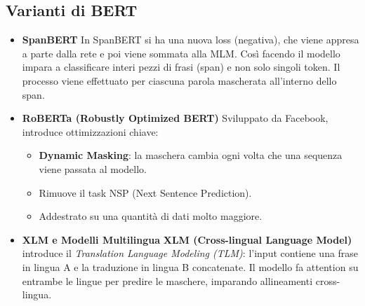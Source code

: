         \subsection{Varianti di BERT}
            
            \begin{itemize}
            
                \item\textbf{SpanBERT}
                In SpanBERT si ha una nuova loss (negativa), che viene appresa a parte dalla rete e poi viene sommata alla MLM.
                Così facendo il modello impara a classificare interi pezzi di frasi (span) e non solo singoli token. Il processo viene effettuato per ciascuna parola mascherata all'interno dello span.
                
                \item\textbf{RoBERTa (Robustly Optimized BERT)}
                Sviluppato da Facebook, introduce ottimizzazioni chiave:
                \begin{itemize}
                    \item \textbf{Dynamic Masking}: la maschera cambia ogni volta che una sequenza viene passata al modello.
                    \item Rimuove il task NSP (Next Sentence Prediction).
                    \item Addestrato su una quantità di dati molto maggiore.
                \end{itemize}
                
                \item\textbf{XLM e Modelli Multilingua}
                \textbf{XLM (Cross-lingual Language Model)} introduce il \textit{Translation Language Modeling (TLM)}: l'input contiene una frase in lingua A e la traduzione in lingua B concatenate. Il modello fa attention su entrambe le lingue per predire le maschere, imparando allineamenti cross-lingua.
            
            \end{itemize}